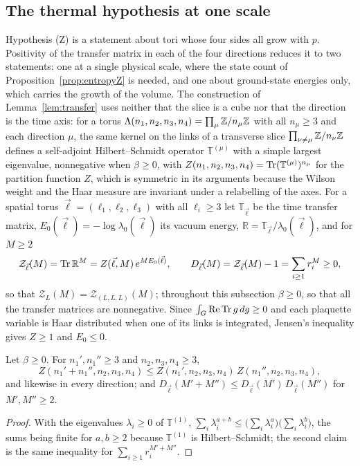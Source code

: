 \subsection{The thermal hypothesis at one scale}\label{ssec:onescale}

Hypothesis (Z) is a statement about tori whose four sides all grow with
$p$. Positivity of the transfer matrix in each of the four directions
reduces it to two statements: one at a single physical scale, where the
state count of Proposition~\ref{prop:entropyZ} is needed, and one about
ground-state energies only, which carries the growth of the volume. The
construction of Lemma~\ref{lem:transfer} uses neither that the slice is a
cube nor that the direction is the time axis: for a torus $\Lambda(n_1,n_2,
n_3,n_4)=\prod_\mu\mathbb{Z}/n_\mu\mathbb{Z}$ with all $n_\mu\ge3$ and each direction $\mu$,
the same kernel on the links of a transverse slice $\prod_{\nu\ne\mu}\mathbb{Z}/n_\nu
\mathbb{Z}$ defines a self-adjoint Hilbert--Schmidt operator $\mathbb T^{(\mu)}$
with a simple largest eigenvalue, nonnegative when $\beta\ge0$, with
$Z(n_1,n_2,n_3,n_4)=\operatorname{Tr}(\mathbb T^{(\mu)})^{n_\mu}$ for the partition
function $Z$, which is symmetric in its arguments because the Wilson weight
and the Haar measure are invariant under a relabelling of the axes. For a
spatial torus $\vec\ell=(\ell_1,\ell_2,\ell_3)$ with all $\ell_i\ge3$ let
$\mathbb T_{\vec\ell}$ be the time transfer matrix, $E_0(\vec\ell)=-\log
\lambda_0(\vec\ell)$ its vacuum energy, $\mathbb R=\mathbb T_{\vec\ell}/
\lambda_0(\vec\ell)$, and for $M\ge2$
\[
\mathcal Z_{\vec\ell}(M)=\operatorname{Tr}\mathbb R^M=Z(\vec\ell,M)\,e^{ME_0(\vec\ell)},
\qquad D_{\vec\ell}(M)=\mathcal Z_{\vec\ell}(M)-1=\sum_{i\ge1}r_i^M\ge0,
\]
so that $\mathcal Z_L(M)=\mathcal Z_{(L,L,L)}(M)$; throughout this subsection
$\beta\ge0$, so that all the transfer matrices are nonnegative. Since $\int_G
\operatorname{Re}\operatorname{Tr} g\,dg\ge0$ and each plaquette variable is Haar distributed when one of
its links is integrated, Jensen's inequality gives $Z\ge1$ and $E_0\le0$.

\begin{lemma}\label{lem:cutside}
Let $\beta\ge0$. For $n_1',n_1''\ge3$ and $n_2,n_3,n_4\ge3$,
\[
Z(n_1'+n_1'',n_2,n_3,n_4)\le Z(n_1',n_2,n_3,n_4)\,Z(n_1'',n_2,n_3,n_4),
\]
and likewise in every direction; and $D_{\vec\ell}(M'+M'')\le D_{\vec\ell}
(M')\,D_{\vec\ell}(M'')$ for $M',M''\ge2$.
\end{lemma}

\begin{proof}
With the eigenvalues $\lambda_i\ge0$ of $\mathbb T^{(1)}$, $\sum_i\lambda_i^{a
+b}\le\bigl(\sum_i\lambda_i^a\bigr)\bigl(\sum_i\lambda_i^b\bigr)$, the sums
being finite for $a,b\ge2$ because $\mathbb T^{(1)}$ is Hilbert--Schmidt;
the second claim is the same inequality for $\sum_{i\ge1}r_i^{M'+M''}$.
\end{proof}

